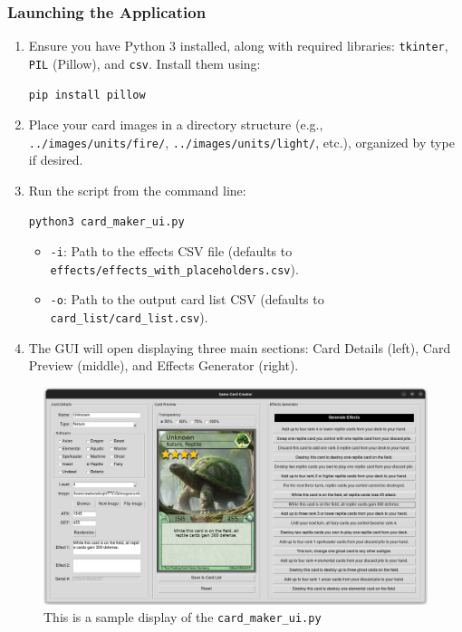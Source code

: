 \subsubsection{Launching the Application}

\begin{enumerate}
    \item Ensure you have Python 3 installed, along with required libraries: \texttt{tkinter}, \texttt{PIL} (Pillow), and \texttt{csv}. Install them using:
\begin{lstlisting}[style=terminalstyle]
pip install pillow
\end{lstlisting}
    \item Place your card images in a directory structure (e.g., \texttt{../images/units/fire/}, \texttt{../images/units/light/}, etc.), organized by type if desired.
    \item Run the script from the command line:
\begin{lstlisting}[style=terminalstyle]
python3 card_maker_ui.py
\end{lstlisting}
          \begin{itemize}
              \item \texttt{-i}: Path to the effects CSV file (defaults to \texttt{effects/effects\_with\_placeholders.csv}).
              \item \texttt{-o}: Path to the output card list CSV (defaults to \texttt{card\_list/card\_list.csv}).
          \end{itemize}
    \item The GUI will open displaying three main sections: Card Details (left), Card Preview (middle), and Effects Generator (right).
\end{enumerate}

\begin{figure}[h]
	\centering
	\includegraphics[width=\textwidth]{images/ui_sample.png} 
	\caption{This is a sample display of the \texttt{card\_maker\_ui.py}}
	\label{fig:sample_ui_window}
\end{figure}

